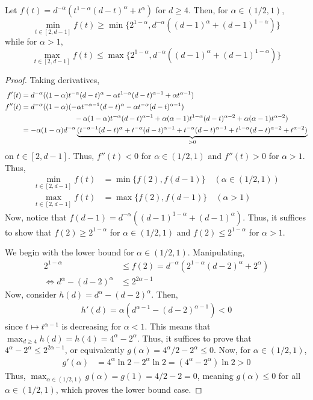 \documentclass[11pt]{article}
\begin{document}
\begin{lemma}\label{lemma:m2-right-min}
    Let $f(t)=d^{-\alpha}(t^{1-\alpha}(d-t)^{\alpha}+t^\alpha)$ for $d\geq 4$. Then, for $\alpha \in (1/2,1)$,
    $$\min_{t\in [2,d-1]}f(t)\geq \min\{2^{1-\alpha},d^{-\alpha}((d-1)^\alpha+(d-1)^{1-\alpha})\}$$
    while for $\alpha > 1$, 
    $$\max_{t\in [2,d-1]}f(t)\leq \max \{2^{1-\alpha},d^{-\alpha}((d-1)^\alpha+(d-1)^{1-\alpha})\}$$
\end{lemma}
\begin{proof}
Taking derivatives,
\begin{align*}
    f'(t)&=d^{-\alpha}((1-\alpha)t^{-\alpha}(d-t)^\alpha -\alpha t^{1-\alpha}(d-t)^{\alpha-1} +\alpha t^{\alpha-1} )\\
    f''(t)&=d^{-\alpha}((1-\alpha)(-\alpha t^{-\alpha-1}(d-t)^\alpha-\alpha t^{-\alpha }(d-t)^{\alpha-1})\\
    &\hspace{2.6cm}-\alpha(1-\alpha)t^{-\alpha}(d-t)^{\alpha-1}+\alpha(\alpha-1)t^{1-\alpha}(d-t)^{\alpha-2}+\alpha(\alpha-1) t^{\alpha-2})\\
    &=-\alpha(1-\alpha)d^{-\alpha}\underbrace{(t^{-\alpha-1}(d-t)^\alpha +t^{-\alpha}(d-t)^{\alpha-1}+t^{-\alpha}(d-t)^{\alpha-1}+t^{1-\alpha}(d-t)^{\alpha-2}+t^{\alpha-2})}_{>0}
\end{align*}
on $t\in [2,d-1]$. Thus, $f''(t) < 0$ for $\alpha \in (1/2,1)$ and $f''(t)>0$ for $\alpha >1$. Thus, 
\begin{align*}
    \min_{t\in [2,d-1]}f(t)&=\min\{f(2),f(d-1)\}\quad (\alpha \in (1/2,1))\\
    \max_{t\in [2,d-1]}f(t)&=\max \{f(2),f(d-1)\}\quad (\alpha > 1)
\end{align*}
Now, notice that $f(d-1)=d^{-\alpha}((d-1)^{1-\alpha}+(d-1)^\alpha)$. Thus, it suffices to show that $f(2)\geq 2^{1-\alpha}$ for $\alpha \in (1/2,1)$ and $f(2)\leq 2^{1-\alpha}$ for $\alpha > 1$. 

We begin with the lower bound for $\alpha \in (1/2,1)$. Manipulating,
\begin{align*}
    2^{1-\alpha}&\leq f(2)=d^{-\alpha}(2^{1-\alpha}(d-2)^{\alpha}+2^{\alpha}) \\
    \Leftrightarrow d^\alpha -(d-2)^\alpha &\leq 2^{2\alpha -1}
\end{align*}
Now, consider $h(d)=d^\alpha-(d-2)^\alpha$. Then, 
\begin{align*}
    h'(d)=\alpha(d^{\alpha-1} -(d-2)^{\alpha-1})<0 
\end{align*}
since $t\mapsto t^{\alpha-1}$ is decreasing for $\alpha < 1$. This means that $\max_{d\geq 4}h(d)=h(4)=4^\alpha-2^\alpha $. Thus, it suffices to prove that $4^\alpha-2^\alpha \leq 2^{2\alpha-1}$, or equivalently $g(\alpha)=4^\alpha/2-2^\alpha \leq 0$. Now, for $\alpha \in (1/2,1)$,
\begin{align*}
    g'(\alpha)&=4^\alpha\ln 2 -2^\alpha\ln2=(4^\alpha-2^\alpha)\ln 2 > 0 
\end{align*}
Thus, $\max_{\alpha \in (1/2,1)}g(\alpha)=g(1)=4/2-2=0$, meaning $g(\alpha)\leq 0$ for all $\alpha \in (1/2,1)$, which proves the lower bound case. 


\end{proof}
\end{document}
